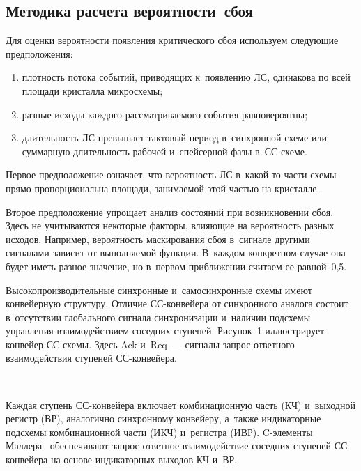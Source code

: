 \begin{multicols}{2}
\section{Методика расчета вероятности~сбоя}

  Для оценки вероятности появления критического сбоя используем 
следующие предположения:


\noindent
  \begin{enumerate}[(1)]
\item плотность потока событий, приводящих к~появлению ЛС, 
одинакова по всей площади крис\-тал\-ла микросхемы;
\item разные исходы каждого рассматриваемого события равновероятны;
\item длительность ЛС превышает тактовый период в~синхронной схеме или 
суммарную длительность рабочей и~спейсерной фазы в~СС-схеме. 
\end{enumerate}

  Первое предположение означает, что вероятность ЛС в~какой-то части схемы 
прямо пропорциональна площади, занимаемой этой частью на кристалле.
  
  Второе предположение упрощает анализ со\-сто\-яний при возникновении сбоя. 
Здесь не учитываются некоторые факторы, вли\-я\-ющие на ве\-ро\-ят\-ность разных 
исходов. Например, ве\-ро\-ят\-ность маскирования сбоя в~сигнале другими 
сигналами зависит от вы\-пол\-ня\-емой функции. В~каж\-дом конкретном случае она 
будет иметь разное значение, но в~пер\-вом при\-бли\-же\-нии считаем ее равной~0,5.
  
  Высокопроизводительные синхронные и~самосинхронные схемы имеют конвейерную 
структуру. Отличие СС-кон\-вей\-ера от синхронного аналога состоит 
в~отсутствии глобального сигнала синхронизации и~наличии подсхемы 
управления взаимодействием соседних ступеней. Рисунок~1 иллюстрирует 
конвейер СС-схе\-мы. Здесь Ack и~Req~--- сигналы за\-прос-от\-вет\-но\-го 
взаимодействия ступеней СС-кон\-вей\-ера.
  
\begin{figure*} %
\vspace*{1pt}
\begin{center}  
\mbox{%
\epsfxsize=115.462mm
}
\end{center}
\vspace*{-9pt}
\end{figure*}

  Каждая ступень СС-кон\-вей\-ера включает комбинационную часть (КЧ) 
и~выходной регистр (ВР), аналогично синхронному конвейеру, а~также 
индикаторные подсхемы комбинационной час\-ти (ИКЧ) и~регистра (ИВР).  
C-эле\-мен\-ты Маллера~\cite{7-sok} обеспечивают за\-прос-от\-вет\-ное взаимодействие 
соседних ступеней СС-кон\-вей\-ера на основе индикаторных выходов КЧ и~ВР.
  

\end{multicols}
